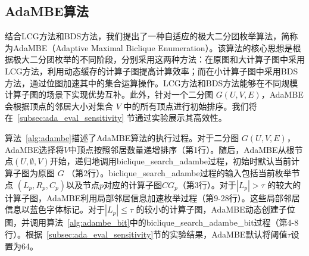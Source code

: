 \subsection{AdaMBE算法}
\label{subsec:ada_design_all}

结合LCG方法和BDS方法，我们提出了一种自适应的极大二分团枚举算法，简称为AdaMBE（Adaptive Maximal Biclique Enumeration）。该算法的核心思想是根据极大二分团枚举的不同阶段，分别采用这两种方法：在原图和大计算子图中采用LCG方法，利用动态缓存的计算子图提高计算效率；而在小计算子图中采用BDS方法，通过位图加速其中的集合运算操作。LCG方法和BDS方法能够在不同规模计算子图的场景下实现优势互补。此外，针对一个二分图 $G(U,V,E)$，AdaMBE会根据顶点的邻居大小对集合 $V$ 中的所有顶点进行初始排序。我们将在~\ref{subsec:ada_eval_sensitivity} 节通过实验展示其高效性。




算法~\ref{alg:adambe}描述了AdaMBE算法的执行过程。对于二分图 $G(U,V,E)$，AdaMBE选择将$V$中顶点按照邻居数量递增排序（第1行）。随后，AdaMBE从根节点$(U,\emptyset,V)$开始，递归地调用\textsf{biclique\_search\_adambe}过程，初始时默认当前计算子图为原图 $G$ （第2行）。\textsf{biclique\_search\_adambe}过程的输入包括当前枚举节点 $(L_p, R_p, C_p)$以及节点$p$对应的计算子图$CG_p$（第3行）。对于$|L_p| > \tau$ 的较大的计算子图，AdaMBE利用局部邻居信息加速枚举过程（第9-28行）。这些局部邻居信息以蓝色字体标记。对于$|L_p| \le \tau$ 的较小的计算子图，AdaMBE动态创建子位图，并调用算法~\ref{alg:adambe_bit}中的\textsf{biclique\_search\_adambe\_bit}过程（第4-8行）。根据~\ref{subsec:ada_eval_sensitivity}节的实验结果，AdaMBE默认将阈值$\tau$设置为64。






